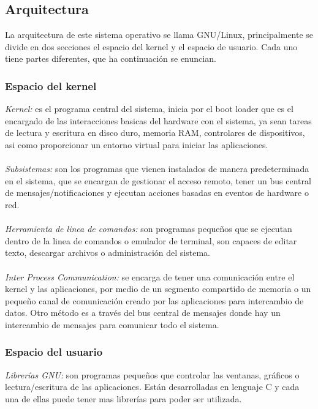 \documentclass[10pt,a4paper,titlepage]{article}
\begin{document}
	\subsection*{Arquitectura}
	La arquitectura de este sistema operativo se llama GNU/Linux, principalmente se divide en dos secciones el espacio del kernel y el espacio de usuario. Cada uno tiene partes diferentes, que ha continuación se enuncian.
	
	\subsubsection*{Espacio del kernel}
	
	\emph{Kernel:} es el programa central del sistema, inicia por el boot loader que es el encargado de las interacciones basicas del hardware con el sistema, ya sean tareas de lectura y escritura en disco duro, memoria RAM, controlares de dispositivos, asi como proporcionar un entorno virtual para iniciar las aplicaciones.
	\\
	\\
	\emph{Subsistemas:} son los programas que vienen instalados de manera predeterminada en el sistema, que se encargan de gestionar el acceso remoto, tener un bus central de mensajes/notificaciones y ejecutan acciones basadas en eventos de hardware o red.
	\\
	\\
	\emph{Herramienta de linea de comandos:} son programas pequeños que se ejecutan dentro de la linea de comandos o emulador de terminal, son capaces de editar texto, descargar archivos o administración del sistema.
	\\
	\\
	\emph{Inter Process Communication:} se encarga de tener una comunicación entre el kernel y las aplicaciones, por medio de un segmento compartido de memoria o un pequeño canal de comunicación creado por las aplicaciones para intercambio de datos. Otro método es a través del bus central de mensajes donde hay un intercambio de mensajes para comunicar todo el sistema. 
	
	\subsubsection*{Espacio del usuario}
	
	\emph{Librerías GNU:} son programas pequeños que controlar las ventanas, gráficos o lectura/escritura de las aplicaciones. Están desarrolladas en lenguaje C y cada una de ellas puede tener mas librerías para poder ser utilizada.
	
\end{document}
